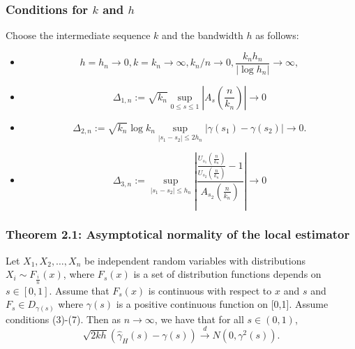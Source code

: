 \documentclass{beamer}
\begin{document}
\begin{frame}
    \frametitle{Conditions for $k$ and $h$}
Choose the intermediate sequence $k$ and the bandwidth $h$ as follows:
\begin{itemize}
    \item \begin{equation}\tag{4}
        h=h_n\to 0, k=k_n \to \infty, k_n/n \to 0, \dfrac{k_nh_n}{|\log h_n|}\to \infty,   
    \end{equation}
 


\item \begin{equation}\tag{5}
    \Delta_{1,n}:=\sqrt{k_n}\sup_{0\le s\le 1}|A_s(\dfrac{n}{k_n})|\to 0 
\end{equation}

  

\item \begin{equation}\tag{6}
    \Delta_{2, n}:=\sqrt{k_{n}} \log k_{n} \sup _{\left|s_{1}-s_{2}\right| \leq 2 h_{n}}\left|\gamma\left(s_{1}\right)-\gamma\left(s_{2}\right)\right| \rightarrow 0.  
\end{equation}



\item \begin{equation}\tag{7}
    \Delta_{3, n}:=\sup _{\left|s_{1}-s_{2}\right| \leq h_{n}}\left|\frac{\frac{U_{s_{1}}\left(\frac{n}{k_{n}}\right)}{U_{s_{2}}\left(\frac{n}{k_{n}}\right)}-1}{A_{s_{2}}\left(\frac{n}{k_{n}}\right)}\right| \rightarrow 0 
\end{equation}
\end{itemize}
    

\end{frame}


\begin{frame}
    \frametitle{Theorem 2.1: Asymptotical normality of the local estimator}

    \begin{theorem}[2.1]
        Let $X_1,X_2,\dots, X_n$ be independent random variables with distributions $X_i \sim F_{\frac{i}{n}}(x)$, where $F_s(x)$ is a set of distribution functions depends on $s\in [0,1]$. Assume that $F_s(x)$ is continuous with respect to $x$ and $s$ and $F_s \in D_{\gamma(s)}$ where $\gamma(s)$ is a positive continuous function on [0,1]. Assume conditions (3)-(7). Then as $n \to \infty$, we have that for all $s\in (0,1)$, 
$$
\sqrt{2kh}(\hat{\gamma}_H(s)-\gamma(s))\stackrel{d}{\to}N(0,\gamma^2(s)).
$$    
    \end{theorem}
\end{frame}
\end{document}
